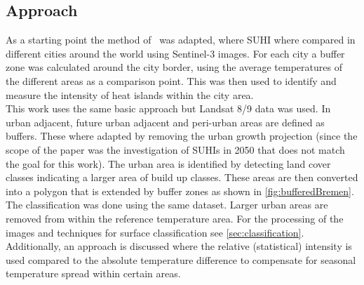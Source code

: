 \documentclass[12pt,a4paper, english,twoside]{scrartcl}
\begin{document}
    \subsection{Approach}
      As a starting point the method of~\cite{Sobrino2020} was adapted, where \gls{SUHI} where compared in different cities around the world using Sentinel-3 images. 
      For each city a buffer zone was calculated around the city border, using the average temperatures of the different areas as a comparison point.
      This was then used to identify and measure the intensity of heat islands within the city area.\\ 
      This work uses the same basic approach but Landsat 8/9 data was used. 
      In~\cite{Sobrino2020} urban adjacent, future urban adjacent and peri-urban areas are defined as buffers.
      These where adapted by removing the urban growth projection (since the scope of the paper was the investigation of \glspl{SUHI} in 2050 that does not match the goal for this work).
      The urban area is identified by detecting land cover classes indicating a larger area of build up classes. 
      These areas are then converted into a polygon that is extended by buffer zones as shown in \cref{fig:bufferedBremen}.
      The classification was done using the same dataset.
      Larger urban areas are removed from within the reference temperature area.
      For the processing of the images and techniques for surface classification see \cref{sec:classification}. 
      Additionally, an approach is discussed where the relative (statistical) intensity is used compared to the absolute temperature difference to compensate for seasonal temperature spread within certain areas.
      \newpage
\end{document}
